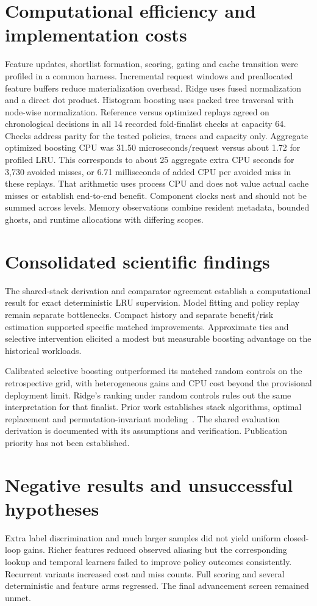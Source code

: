 \documentclass[11pt,letterpaper]{article}
\begin{document}
\section{Computational efficiency and implementation costs}
Feature updates, shortlist formation, scoring, gating and cache transition were profiled in a common harness. Incremental request windows and preallocated feature buffers reduce materialization overhead. Ridge uses fused normalization and a direct dot product. Histogram boosting uses packed tree traversal with node-wise normalization. Reference versus optimized replays agreed on chronological decisions in all 14 recorded fold-finalist checks at capacity 64. Checks address parity for the tested policies, traces and capacity only. Aggregate optimized boosting CPU was 31.50 microseconds/request versus about 1.72 for profiled LRU. This corresponds to about 25 aggregate extra CPU seconds for 3,730 avoided misses, or 6.71 milliseconds of added CPU per avoided miss in these replays. That arithmetic uses process CPU and does not value actual cache misses or establish end-to-end benefit. Component clocks nest and should not be summed across levels. Memory observations combine resident metadata, bounded ghosts, and runtime allocations with differing scopes.

\section{Consolidated scientific findings}
The shared-stack derivation and comparator agreement establish a computational result for exact deterministic LRU supervision. Model fitting and policy replay remain separate bottlenecks. Compact history and separate benefit/risk estimation supported specific matched improvements. Approximate ties and selective intervention elicited a modest but measurable boosting advantage on the historical workloads.

Calibrated selective boosting outperformed its matched random controls on the retrospective grid, with heterogeneous gains and CPU cost beyond the provisional deployment limit. Ridge's ranking under random controls rules out the same interpretation for that finalist. Prior work establishes stack algorithms, optimal replacement and permutation-invariant modeling~\cite{mattson,belady,deepsets}. The shared evaluation derivation is documented with its assumptions and verification. Publication priority has not been established.

\section{Negative results and unsuccessful hypotheses}
Extra label discrimination and much larger samples did not yield uniform closed-loop gains. Richer features reduced observed aliasing but the corresponding lookup and temporal learners failed to improve policy outcomes consistently. Recurrent variants increased cost and miss counts. Full scoring and several deterministic and feature arms regressed. The final advancement screen remained unmet.
\end{document}
